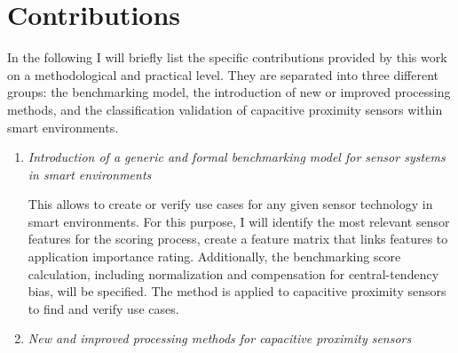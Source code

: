 \section{Contributions}
In the following I will briefly list the specific contributions provided by this work on a methodological and practical level. They are separated into three different groups: the benchmarking model, the introduction of new or improved processing methods, and the classification validation of capacitive proximity sensors within smart environments.
\begin{enumerate}
\item \emph{Introduction of a generic and formal benchmarking model for sensor systems in smart environments} 

This allows to create or verify use cases for any given sensor technology in smart environments. For this purpose, I will identify the most relevant sensor features for the scoring process, create a feature matrix that links features to application importance rating. Additionally, the benchmarking score calculation, including normalization and compensation for central-tendency bias, will be specified. The method is applied to capacitive proximity sensors to find and verify use cases.
\item \emph{New and improved processing methods for capacitive proximity sensors} 


\end{enumerate}
